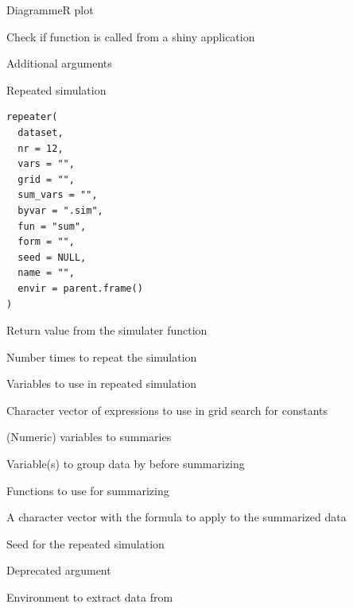 \documentclass[a4paper]{book}
\begin{document}
%
\begin{Arguments}
\begin{ldescription}
\item[\code{object}] DiagrammeR plot

\item[\code{shiny}] Check if function is called from a shiny application

\item[\code{...}] Additional arguments
\end{ldescription}
\end{Arguments}
%
\begin{Description}
Repeated simulation
\end{Description}
%
\begin{Usage}
\begin{verbatim}
repeater(
  dataset,
  nr = 12,
  vars = "",
  grid = "",
  sum_vars = "",
  byvar = ".sim",
  fun = "sum",
  form = "",
  seed = NULL,
  name = "",
  envir = parent.frame()
)
\end{verbatim}
\end{Usage}
%
\begin{Arguments}
\begin{ldescription}
\item[\code{dataset}] Return value from the simulater function

\item[\code{nr}] Number times to repeat the simulation

\item[\code{vars}] Variables to use in repeated simulation

\item[\code{grid}] Character vector of expressions to use in grid search for constants

\item[\code{sum\_vars}] (Numeric) variables to summaries

\item[\code{byvar}] Variable(s) to group data by before summarizing

\item[\code{fun}] Functions to use for summarizing

\item[\code{form}] A character vector with the formula to apply to the summarized data

\item[\code{seed}] Seed for the repeated simulation

\item[\code{name}] Deprecated argument

\item[\code{envir}] Environment to extract data from
\end{ldescription}
\end{Arguments}
\end{document}
